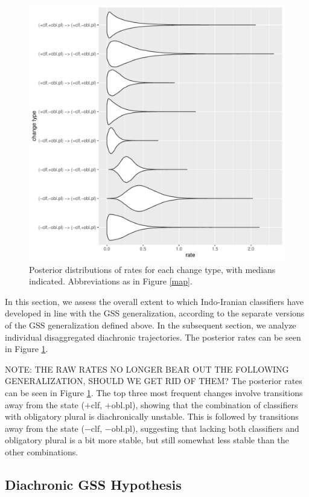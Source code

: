 \documentclass[11pt]{article}
\begin{document}
\begin{figure}
\includegraphics[width=.9\linewidth]{code/all_rates.pdf}
\caption{Posterior distributions of rates for each change type, with medians indicated. Abbreviations as in Figure \ref{map}.}
\label{all_rates}
\end{figure}

In this section, we assess the overall extent to which Indo-Iranian classifiers have developed in line with the GSS generalization, according to the separate versions of the GSS generalization defined above. 
In the subsequent section, we analyze individual disaggregated diachronic trajectories. 
The posterior rates can be seen in Figure \ref{all_rates}. 


{\color{blue} NOTE: THE RAW RATES NO LONGER BEAR OUT THE FOLLOWING GENERALIZATION, SHOULD WE GET RID OF THEM? The posterior rates can be seen in Figure \ref{all_rates}. The top three most frequent changes involve transitions away from the state {\sc ($+$clf, $+$obl.pl)}, showing that the combination of classifiers with obligatory plural is diachronically unstable.
This is followed by transitions away from the state {\sc ($-$clf, $-$obl.pl)}, suggesting that lacking both classifiers and obligatory plural is a bit more stable, but still somewhat less stable than the other combinations.}

\subsection{Diachronic GSS Hypothesis}
\end{document}
